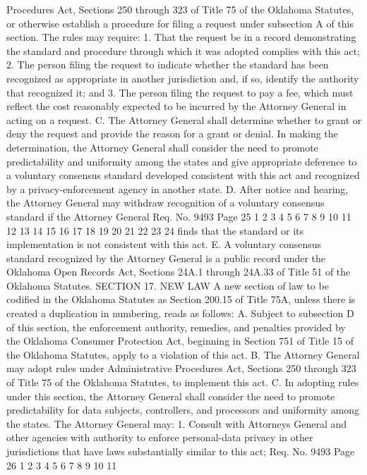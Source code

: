 Procedures Act, Sections 250 through 323 of Title 75 of the Oklahoma
Statutes, or otherwise establish a procedure for filing a request under
subsection A of this section. The rules may require:
1. That the request be in a record demonstrating the standard and
procedure through which it was adopted complies with this act;
2. The person filing the request to indicate whether the standard
has been recognized as appropriate in another jurisdiction and, if so,
identify the authority that recognized it; and
3. The person filing the request to pay a fee, which must reflect
the cost reasonably expected to be incurred by the Attorney General in
acting on a request.
C. The Attorney General shall determine whether to grant or deny
the request and provide the reason for a grant or denial. In making
the determination, the Attorney General shall consider the need to
promote predictability and uniformity among the states and give
appropriate deference to a voluntary consensus standard developed
consistent with this act and recognized by a privacy-enforcement agency
in another state.
D. After notice and hearing, the Attorney General may withdraw
recognition of a voluntary consensus standard if the Attorney General
Req. No. 9493 Page 25
1
2
3
4
5
6
7
8
9
10
11
12
13
14
15
16
17
18
19
20
21
22
23
24
finds that the standard or its implementation is not consistent with
this act.
E. A voluntary consensus standard recognized by the Attorney
General is a public record under the Oklahoma Open Records Act,
Sections 24A.1 through 24A.33 of Title 51 of the Oklahoma Statutes.
SECTION 17. NEW LAW A new section of law to be codified
in the Oklahoma Statutes as Section 200.15 of Title 75A, unless
there is created a duplication in numbering, reads as follows:
A. Subject to subsection D of this section, the enforcement
authority, remedies, and penalties provided by the Oklahoma Consumer
Protection Act, beginning in Section 751 of Title 15 of the Oklahoma
Statutes, apply to a violation of this act.
B. The Attorney General may adopt rules under Administrative
Procedures Act, Sections 250 through 323 of Title 75 of the Oklahoma
Statutes, to implement this act.
C. In adopting rules under this section, the Attorney General
shall consider the need to promote predictability for data subjects,
controllers, and processors and uniformity among the states. The
Attorney General may:
1. Consult with Attorneys General and other agencies with
authority to enforce personal-data privacy in other jurisdictions
that have laws substantially similar to this act;
Req. No. 9493 Page 26
1
2
3
4
5
6
7
8
9
10
11
